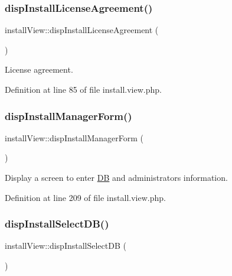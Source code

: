 \subsubsection{\texorpdfstring{disp\+Install\+License\+Agreement()}{dispInstallLicenseAgreement()}}
{\footnotesize\ttfamily install\+View\+::disp\+Install\+License\+Agreement (\begin{DoxyParamCaption}{ }\end{DoxyParamCaption})}



License agreement. 



Definition at line 85 of file install.\+view.\+php.

\mbox{\label{classinstallView_a00758f2134453587a409e8e8f3e4fada}} 
\subsubsection{\texorpdfstring{disp\+Install\+Manager\+Form()}{dispInstallManagerForm()}}
{\footnotesize\ttfamily install\+View\+::disp\+Install\+Manager\+Form (\begin{DoxyParamCaption}{ }\end{DoxyParamCaption})}



Display a screen to enter \hyperlink{classDB}{DB} and administrator\textquotesingle{}s information. 



Definition at line 209 of file install.\+view.\+php.

\mbox{\label{classinstallView_aa3ee9747353f128111f628a5c9359c5f}} 
\subsubsection{\texorpdfstring{disp\+Install\+Select\+D\+B()}{dispInstallSelectDB()}}
{\footnotesize\ttfamily install\+View\+::disp\+Install\+Select\+DB (\begin{DoxyParamCaption}{ }\end{DoxyParamCaption})}



